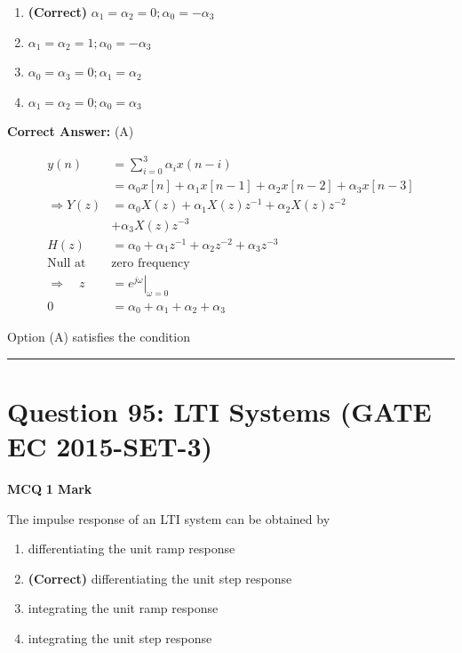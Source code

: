 \documentclass[11pt,a4paper]{article}
\begin{document}
\begin{enumerate}[label=(\Alph*)]
    \item \textbf{(Correct)} $\alpha_{1}= \alpha_{2}=0; \alpha_{0} =-\alpha_{3}$
    \item $\alpha_{1}= \alpha_{2}=1; \alpha_{0} =-\alpha_{3}$
    \item $\alpha_{0}= \alpha_{3}=0; \alpha_{1} =\alpha_{2}$
    \item $\alpha_{1}= \alpha_{2}=0; \alpha_{0} =\alpha_{3}$
\end{enumerate}

\noindent \textbf{Correct Answer:} (A)

\begin{tcolorbox}[solbox, title=Detailed Solution -- Question 94]
\[
\begin{aligned} y(n)&=\sum_{i=0}^{3} \alpha_{i} x(n-i) \\ &=\alpha_{0}x[n]+\alpha_{1} x[n-1]+\alpha_{2} x[n-2]+\alpha_{3} x[n-3] \\ \Rightarrow Y(z)&=\alpha_{0} X(z)+\alpha_{1} X(z) z^{-1}+\alpha_{2} X(z) z^{-2} \\ & +\alpha_{3} X(z) z^{-3} \\ H(z)&=\alpha_{0}+\alpha_{1} z^{-1}+\alpha_{2} z^{-2}+\alpha_{3} z^{-3} \\ \text {Null at }&\text{zero frequency } \\ \Rightarrow \quad z&=\left.e^{j \omega}\right|_{\omega=0}\\ 0 &= \alpha_{0}+\alpha_{1}+\alpha_{2}+\alpha_{3} \end{aligned}
\]
 
Option (A) satisfies the condition
\end{tcolorbox}

\vspace{1.5em}
\hrule
\vspace{1.5em}

\section*{Question 95: LTI Systems (GATE EC 2015-SET-3)}
\noindent \textbf{\color{primary}MCQ} \hfill \textbf{\color{secondary}1 Mark}


\noindent The impulse response of an LTI system can be obtained by


\begin{enumerate}[label=(\Alph*)]
    \item differentiating the unit ramp response
    \item \textbf{(Correct)} differentiating the unit step response
    \item integrating the unit ramp response
    \item integrating the unit step response
\end{enumerate}
\end{document}
